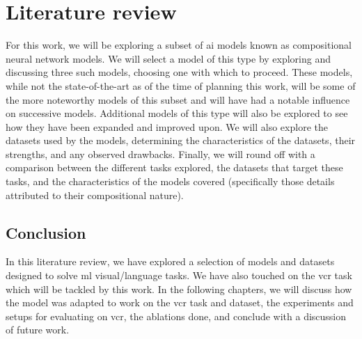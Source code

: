 \chapter{Literature review}
\label{chp:literature_review}

For this work, we will be exploring a subset of \gls{ai} models known as compositional neural network models.
We will select a model of this type by exploring and discussing three such models, choosing one with which to proceed.
These models, while not the state-of-the-art as of the time of planning this work, will be some of the more noteworthy models of this subset and will have had a notable influence on successive models.
Additional models of this type will also be explored to see how they have been expanded and improved upon.
We will also explore the datasets used by the models, determining the characteristics of the datasets, their strengths, and any observed drawbacks.
Finally, we will round off with a comparison between the different tasks explored, the datasets that target these tasks, and the characteristics of the models covered (specifically those details attributed to their compositional nature).


\clearpage


\clearpage


\clearpage


\clearpage

\section{Conclusion}
\label{sec:literature_review_conclusion}

In this literature review, we have explored a selection of models and datasets designed to solve \gls{ml} visual/language tasks.
We have also touched on the \gls{vcr} task which will be tackled by this work.
In the following chapters, we will discuss how the model was adapted to work on the \gls{vcr} task and dataset, the experiments and setups for evaluating on \gls{vcr}, the ablations done, and conclude with a discussion of future work.

